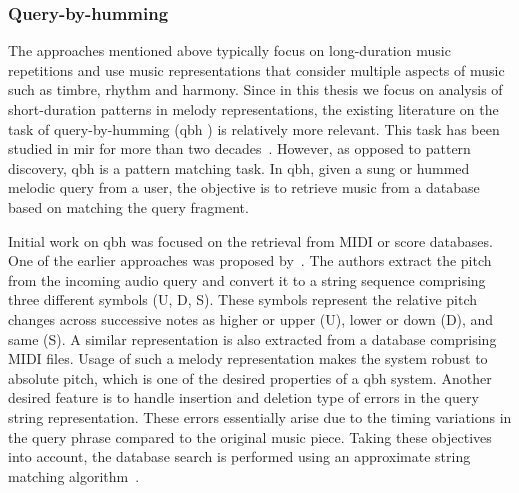

\subsubsection{Query-by-humming}
\label{sec:query_by_humming}

The approaches mentioned above typically focus on long-duration music repetitions and use music representations that consider multiple aspects of music such as timbre, rhythm and harmony. Since in this thesis we focus on analysis of short-duration patterns in melody representations, the existing literature on the task of query-by-humming (\gls{qbh} ) is relatively more relevant. This task has been studied in \gls{mir} for more than two decades~\citep{ghias1995query,McNab1996}. However, as opposed to pattern discovery, \gls{qbh} is a pattern matching task. In \gls{qbh}, given a sung or hummed melodic query from a user, the objective is to retrieve music from a database based on matching the query fragment. 

Initial work on \gls{qbh} was focused on the retrieval from MIDI or score databases. One of the earlier approaches was proposed by~\cite{ghias1995query}. The authors extract the pitch from the incoming audio query and convert it to a string sequence comprising three different symbols (U, D, S). These symbols represent the relative pitch changes across successive notes as higher or upper (U), lower or down (D), and same (S). A similar representation is also extracted from a database comprising MIDI files. Usage of such a melody representation makes the system robust to absolute pitch, which is one of the desired properties of a \gls{qbh} system. Another desired feature is to handle insertion and deletion type of errors in the query string representation. These errors essentially arise due to the timing variations in the query phrase compared to the original music piece. Taking these objectives into account, the database search is performed using an approximate string matching algorithm~\citep{baeza1992fast}.

